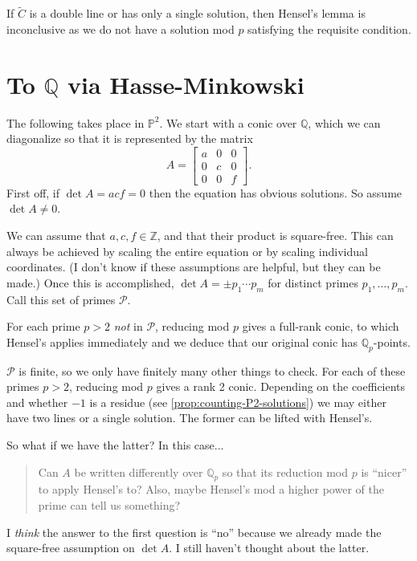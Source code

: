 \documentclass[10pt,a4paper]{amsart}
\numberwithin{equation}{section}
\numberwithin{figure}{section}
\theoremstyle{definition}
\theoremstyle{remark}
\theoremstyle{plain}
\theoremstyle{plain}
\theoremstyle{definition}
\theoremstyle{plain}
\theoremstyle{plain}
\renewcommand{\P}{\mathbb{P}}
\newcommand{\Z}{\mathbb{Z}}
\newcommand{\Q}{\mathbb{Q}}
\begin{document}
	If $\widetilde{C}$ is a double line or has only a single solution, then Hensel's lemma is inconclusive as we do not have a solution mod $p$ satisfying the requisite condition.

    \section{To $\mathbb{Q}$ via Hasse-Minkowski}\label{sec:hasse-minkowski}
    The following takes place in $\P^2$. We start with a conic over $\Q$, which we can diagonalize so that it is represented by the matrix
    \[
    	A= \begin{bmatrix}
    		a & 0 & 0\\
    		0 & c & 0\\
    		0 & 0 & f
    	\end{bmatrix}.
    \]
    First off, if $\det A = acf = 0$ then the equation has obvious solutions. So assume $\det A \neq 0$.
    
    We can assume that $a,c,f \in \Z$, and that their product is square-free. This can always be achieved by scaling the entire equation or by scaling individual coordinates. (I don't know if these assumptions are helpful, but they can be made.) Once this is accomplished, $\det A = \pm p_1\cdots p_m$ for distinct primes $p_1,\ldots,p_m$. Call this set of primes $\mathcal{P}$.
    
    For each prime $p>2$ \emph{not} in $\mathcal{P}$, reducing mod $p$ gives a full-rank conic, to which Hensel's applies immediately and we deduce that our original conic has $\Q_p$-points.
    
    $\mathcal{P}$ is finite, so we only have finitely many other things to check. For each of these primes $p>2$, reducing mod $p$ gives a rank 2 conic. Depending on the coefficients and whether $-1$ is a residue (see \ref{prop:counting-P2-solutions}) we may either have two lines or a single solution. The former can be lifted with Hensel's.
    
    So what if we have the latter? In this case...
    \begin{quotation}
    	Can $A$ be written differently over $\Q_p$ so that its reduction mod $p$ is ``nicer'' to apply Hensel's to? Also, maybe Hensel's mod a higher power of the prime can tell us something?
    \end{quotation}
	I \emph{think} the answer to the first question is ``no'' because we already made the square-free assumption on $\det A$. I still haven't thought about the latter.
	
\end{document}
